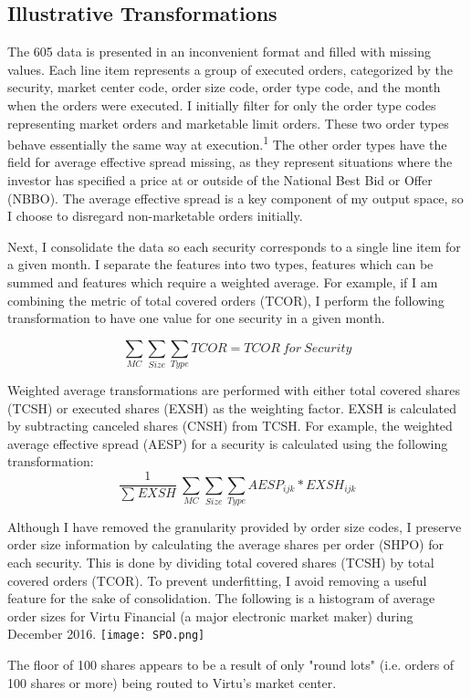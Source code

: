 \documentclass{article}
\begin{document}
\begin{multicols}{2}
\subsection{Illustrative Transformations}
\par
The 605 data is presented in an inconvenient format and filled with missing values. Each line item represents a group of executed orders, categorized by the security, market center code, order size code, order type code, and the month when the orders were executed. I initially filter for only the order type codes representing market orders and marketable limit orders. These two order types behave essentially the same way at execution.\textsuperscript{1} The other order types have the field for average effective spread missing, as they represent situations where the investor has specified a price at or outside of the National Best Bid or Offer (NBBO). The average effective spread is a key component of my output space, so I choose to disregard non-marketable orders initially.
\par
Next, I consolidate the data so each security corresponds to a single line item for a given month. I separate the features into two types, features which can be summed and features which require a weighted average. For example, if I am combining the metric of total covered orders (TCOR), I perform the following transformation to have one value for one security in a given month.

\begin{equation}\sum_{MC} \sum_{Size} \sum_{Type} TCOR = TCOR \: for \: Security \end{equation}

\par
Weighted average transformations are performed with either total covered shares (TCSH) or executed shares (EXSH) as the weighting factor. EXSH is calculated by subtracting canceled shares (CNSH) from TCSH. For example, the weighted average effective spread (AESP) for a security is calculated using the following transformation:
\begin{equation} \frac{1}{\sum_{}EXSH}\ \sum_{MC} \sum_{Size} \sum_{Type} AESP_{ijk}*EXSH_{ijk} \end{equation}

\par
Although I have removed the granularity provided by order size codes, I preserve order size information by calculating the average shares per order (SHPO) for each security. This is done by dividing total covered shares (TCSH) by total covered orders (TCOR). To prevent underfitting, I avoid removing a useful feature for the sake of consolidation. The following is a histogram of average order sizes for Virtu Financial (a major electronic market maker) during December 2016.
\begingroup
    \centering
    \texttt{[image: SPO.png]}
\endgroup
\vspace{3mm}
\par
\noindent The floor of 100 shares appears to be a result of only "round lots" (i.e. orders of 100 shares or more) being routed to Virtu's market center.



\end{multicols}
\end{document}
